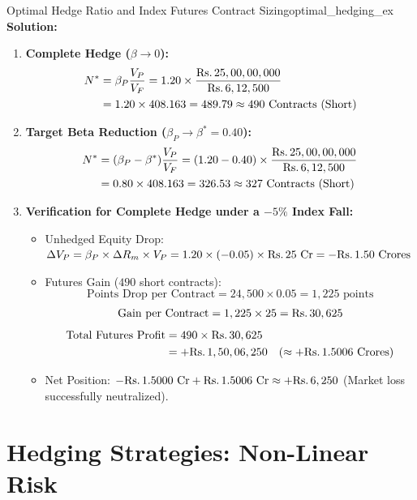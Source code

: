 \begin{example}{Optimal Hedge Ratio and Index Futures Contract Sizing}{optimal_hedging_ex}
\textbf{Solution:}
\begin{enumerate}[leftmargin=1.2em, itemsep=2pt]
    \item \textbf{Complete Hedge ($\beta \rightarrow 0$):}
    \begin{align*}
    N^* &= \beta_P \frac{V_P}{V_F} = 1.20 \times \frac{\text{Rs.}\, 25,00,00,000}{\text{Rs.}\, 6,12,500} \\
    &= 1.20 \times 408.163 = 489.79 \approx 490 \text{ Contracts (Short)}
    \end{align*}
    \item \textbf{Target Beta Reduction ($\beta_P \rightarrow \beta^* = 0.40$):}
    \begin{align*}
    N^* &= (\beta_P - \beta^*) \frac{V_P}{V_F} = (1.20 - 0.40) \times \frac{\text{Rs.}\, 25,00,00,000}{\text{Rs.}\, 6,12,500} \\
    &= 0.80 \times 408.163 = 326.53 \approx 327 \text{ Contracts (Short)}
    \end{align*}
    \item \textbf{Verification for Complete Hedge under a $-5\%$ Index Fall:}
    \begin{itemize}[leftmargin=1.2em, noitemsep]
        \item Unhedged Equity Drop: $\Delta V_P = \beta_P \times \Delta R_m \times V_P = 1.20 \times (-0.05) \times \text{Rs.}\, 25 \text{ Cr} = -\text{Rs.}\, 1.50 \text{ Crores}$
        \item Futures Gain ($490$ short contracts):
        \[
        \text{Points Drop per Contract} = 24,500 \times 0.05 = 1,225 \text{ points}
        \]
        \[
        \text{Gain per Contract} = 1,225 \times 25 = \text{Rs.}\, 30,625
        \]
        \begin{align*}
        \text{Total Futures Profit} &= 490 \times \text{Rs.}\, 30,625 \\
        &= +\text{Rs.}\, 1,50,06,250 \quad (\approx +\text{Rs.}\, 1.5006 \text{ Crores})
        \end{align*}
        \item Net Position: $-\text{Rs.}\, 1.5000 \text{ Cr} + \text{Rs.}\, 1.5006 \text{ Cr} \approx +\text{Rs.}\, 6,250$ (Market loss successfully neutralized).
    \end{itemize}
\end{enumerate}
\end{example}

\section{Hedging Strategies: Non-Linear Risk}

